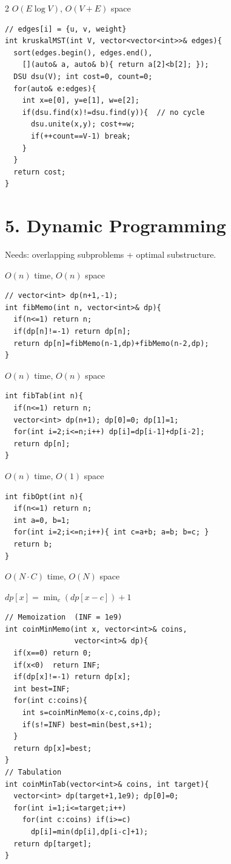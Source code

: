 \documentclass[12pt,landscape,a4paper]{extarticle}
\newcommand{\algo}[2]{\vspace{1pt}{\bfseries #1}\hfill{\footnotesize\color{cx}#2}\par\vspace{-1pt}}
\newcommand{\note}[1]{{\footnotesize\itshape #1}\par}
\begin{document}
\begin{multicols}{2}
\algo{Kruskal's Algorithm}{$O(E\log V)$, $O(V{+}E)$ space}
\begin{lstlisting}
// edges[i] = {u, v, weight}
int kruskalMST(int V, vector<vector<int>>& edges){
  sort(edges.begin(), edges.end(),
    [](auto& a, auto& b){ return a[2]<b[2]; });
  DSU dsu(V); int cost=0, count=0;
  for(auto& e:edges){
    int x=e[0], y=e[1], w=e[2];
    if(dsu.find(x)!=dsu.find(y)){  // no cycle
      dsu.unite(x,y); cost+=w;
      if(++count==V-1) break;
    }
  }
  return cost;
}
\end{lstlisting}

\section*{5. Dynamic Programming}
{\footnotesize Needs: overlapping subproblems + optimal substructure.}

\algo{Fibonacci --- Memoization}{$O(n)$ time, $O(n)$ space}
\begin{lstlisting}
// vector<int> dp(n+1,-1);
int fibMemo(int n, vector<int>& dp){
  if(n<=1) return n;
  if(dp[n]!=-1) return dp[n];
  return dp[n]=fibMemo(n-1,dp)+fibMemo(n-2,dp);
}
\end{lstlisting}
\algo{Fibonacci --- Tabulation}{$O(n)$ time, $O(n)$ space}
\begin{lstlisting}
int fibTab(int n){
  if(n<=1) return n;
  vector<int> dp(n+1); dp[0]=0; dp[1]=1;
  for(int i=2;i<=n;i++) dp[i]=dp[i-1]+dp[i-2];
  return dp[n];
}
\end{lstlisting}
\algo{Fibonacci --- Space Optimized}{$O(n)$ time, $O(1)$ space}
\begin{lstlisting}
int fibOpt(int n){
  if(n<=1) return n;
  int a=0, b=1;
  for(int i=2;i<=n;i++){ int c=a+b; a=b; b=c; }
  return b;
}
\end{lstlisting}

\algo{Coin Change 1 --- Min Coins}{$O(N\cdot C)$ time, $O(N)$ space}
\note{$dp[x]=\min_{c}(dp[x-c])+1$}
\begin{lstlisting}
// Memoization  (INF = 1e9)
int coinMinMemo(int x, vector<int>& coins,
                vector<int>& dp){
  if(x==0) return 0;
  if(x<0)  return INF;
  if(dp[x]!=-1) return dp[x];
  int best=INF;
  for(int c:coins){
    int s=coinMinMemo(x-c,coins,dp);
    if(s!=INF) best=min(best,s+1);
  }
  return dp[x]=best;
}
// Tabulation
int coinMinTab(vector<int>& coins, int target){
  vector<int> dp(target+1,1e9); dp[0]=0;
  for(int i=1;i<=target;i++)
    for(int c:coins) if(i>=c)
      dp[i]=min(dp[i],dp[i-c]+1);
  return dp[target];
}
\end{lstlisting}


\end{multicols}
\end{document}
